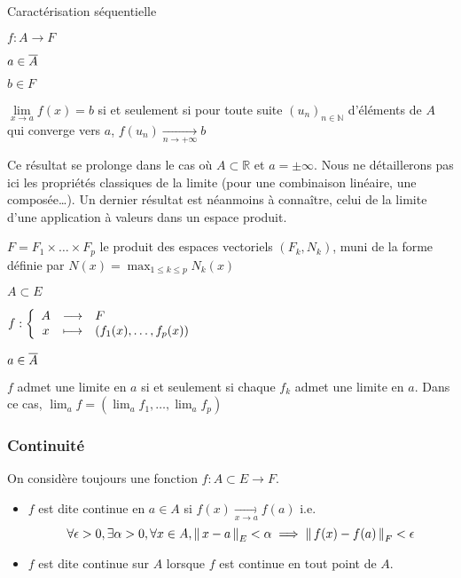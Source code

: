     \begin{prop}{Caractérisation séquentielle}{}
        \begin{soient}
            \item $f : A \rightarrow F$
            \item $a \in \overline{A}$
            \item $b \in F$
        \end{soient}
        $\lim\limits_{x \rightarrow a} f(x) = b$ si et seulement si pour toute suite $(u_n)_{n \in \mathbb{N}}$ d’éléments de $A$ qui converge vers $a$, $f(u_n) \underset{n \rightarrow +\infty}{\longrightarrow} b$
    \end{prop}

    Ce résultat se prolonge dans le cas où $A \subset \mathbb{R}$ et $a = \pm \infty$. Nous ne détaillerons pas ici les propriétés classiques de la limite (pour une combinaison linéaire, une composée\ldots). Un dernier résultat est néanmoins à connaître, celui de la limite d’une application à valeurs dans un espace produit.

    \begin{prop}{}{}
        \begin{soient}
            \item $F = F_1 \times \ldots \times F_p$ le produit des espaces vectoriels $(F_k, N_k)$, muni de la forme définie par $N(x) = \max_{1 \leq k \leq p} N_k(x)$
            \item $A \subset E$
            \item $\fonction{f}{A}{F}{x}{\left(f_1(x), \ldots, f_p(x)\right)}$
            \item $a \in \overline{A}$
        \end{soient}
        $f$ admet une limite en $a$ si et seulement si chaque $f_k$ admet une limite en $a$. Dans ce cas, $\lim_a f = \left(\lim_a f_1,\ldots, \lim_a f_p\right)$
    \end{prop}

    \subsubsection{Continuité}

    On considère toujours une fonction $f : A \subset E \rightarrow F$.

    \begin{defi}{}{}
        \begin{itemize}
            \item $f$ est dite continue en $a \in A$ si $f(x) \underset{x \rightarrow a}{\longrightarrow} f(a)$ i.e.
            \[ \forall \epsilon > 0, \exists \alpha > 0, \forall x \in A, \left\lVert\,x-a\,\right\rVert_E < \alpha \implies \left\lVert\,f(x) - f(a)\,\right\rVert_F < \epsilon \]
            \item $f$ est dite continue sur $A$ lorsque $f$ est continue en tout point de $A$.
        \end{itemize}
    \end{defi}

